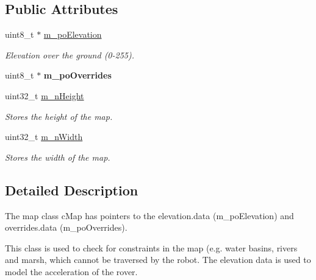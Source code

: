 \subsection*{Public Attributes}
\begin{DoxyCompactItemize}
\item 
\mbox{\label{classplanner_1_1c_graph_a561cbc9758838054e6e0992fc9845c63}} 
uint8\+\_\+t $\ast$ \mbox{\hyperlink{classplanner_1_1c_graph_a561cbc9758838054e6e0992fc9845c63}{m\+\_\+po\+Elevation}}
\begin{DoxyCompactList}\small\item\em Elevation over the ground (0-\/255). \end{DoxyCompactList}\item 
\mbox{\label{classplanner_1_1c_graph_ac27380f471fa1cee26c56ecc39da99cd}} 
uint8\+\_\+t $\ast$ {\bfseries m\+\_\+po\+Overrides}
\item 
\mbox{\label{classplanner_1_1c_graph_aab9f310c1fd5602622910dad3764c498}} 
uint32\+\_\+t \mbox{\hyperlink{classplanner_1_1c_graph_aab9f310c1fd5602622910dad3764c498}{m\+\_\+n\+Height}}
\begin{DoxyCompactList}\small\item\em Stores the height of the map. \end{DoxyCompactList}\item 
\mbox{\label{classplanner_1_1c_graph_ac603a867836ff3827b29d7db8f2555d4}} 
uint32\+\_\+t \mbox{\hyperlink{classplanner_1_1c_graph_ac603a867836ff3827b29d7db8f2555d4}{m\+\_\+n\+Width}}
\begin{DoxyCompactList}\small\item\em Stores the width of the map. \end{DoxyCompactList}\end{DoxyCompactItemize}


\subsection{Detailed Description}
The map class c\+Map has pointers to the elevation.\+data (m\+\_\+po\+Elevation) and overrides.\+data (m\+\_\+po\+Overrides). 

This class is used to check for constraints in the map (e.\+g. water basins, rivers and marsh, which cannot be traversed by the robot. The elevation data is used to model the acceleration of the rover. 

